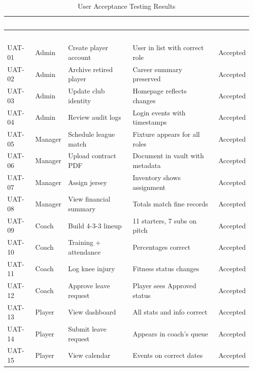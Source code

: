 \documentclass[12pt,a4paper,oneside]{report}
\begin{document}
\begin{longtable}{|l|l|p{4cm}|p{4.5cm}|c|}
\caption{User Acceptance Testing Results}
\label{tab:uat} \\
\hline
\rowcolor{tableHeader}
\textcolor{white}{\textbf{ID}} & \textcolor{white}{\textbf{Role}} & \textcolor{white}{\textbf{Scenario}} & \textcolor{white}{\textbf{Acceptance Criteria}} & \textcolor{white}{\textbf{Result}} \\
\hline
\endfirsthead
\hline
\rowcolor{tableHeader}
\textcolor{white}{\textbf{ID}} & \textcolor{white}{\textbf{Role}} & \textcolor{white}{\textbf{Scenario}} & \textcolor{white}{\textbf{Acceptance Criteria}} & \textcolor{white}{\textbf{Result}} \\
\hline
\endhead
UAT-01  & Admin   & Create player account     & User in list with correct role    & Accepted \\
\hline\rowcolor{tableRow}
UAT-02  & Admin   & Archive retired player    & Career summary preserved          & Accepted \\
\hline
UAT-03  & Admin   & Update club identity      & Homepage reflects changes          & Accepted \\
\hline\rowcolor{tableRow}
UAT-04  & Admin   & Review audit logs         & Login events with timestamps       & Accepted \\
\hline
UAT-05  & Manager & Schedule league match     & Fixture appears for all roles      & Accepted \\
\hline\rowcolor{tableRow}
UAT-06  & Manager & Upload contract PDF       & Document in vault with metadata    & Accepted \\
\hline
UAT-07  & Manager & Assign jersey             & Inventory shows assignment         & Accepted \\
\hline\rowcolor{tableRow}
UAT-08  & Manager & View financial summary    & Totals match fine records           & Accepted \\
\hline
UAT-09  & Coach   & Build 4-3-3 lineup        & 11 starters, 7 subs on pitch       & Accepted \\
\hline\rowcolor{tableRow}
UAT-10  & Coach   & Training + attendance     & Percentages correct                 & Accepted \\
\hline
UAT-11  & Coach   & Log knee injury           & Fitness status changes              & Accepted \\
\hline\rowcolor{tableRow}
UAT-12  & Coach   & Approve leave request     & Player sees Approved status         & Accepted \\
\hline
UAT-13  & Player  & View dashboard            & All stats and info correct          & Accepted \\
\hline\rowcolor{tableRow}
UAT-14  & Player  & Submit leave request      & Appears in coach's queue            & Accepted \\
\hline
UAT-15  & Player  & View calendar             & Events on correct dates             & Accepted \\
\hline
\end{longtable}
\end{document}
